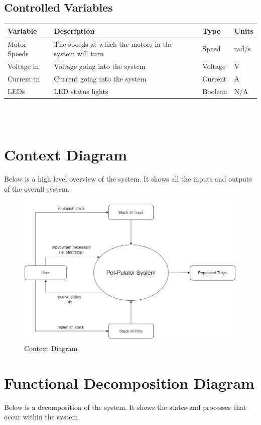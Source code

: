 \documentclass[12pt]{article}
\begin{document}
 \subsection{Controlled Variables}
 \begin{tabular}{ |p{3cm}|p{9cm}|p{2cm}|p{1cm}| }
  \hline
  Variable & Description & Type & Units\\
  \hline
  Motor Speeds & The speeds at which the motors in the system will turn
   & Speed & rad/s\\
  \hline
  Voltage in & Voltage going into the system
   & Voltage & V\\
  \hline
  Current in & Current going into the system
   & Current &  A\\
  \hline
  LEDs & LED status lights
   & Boolean & N/A\\
  
  \hline
 \end{tabular}\\\\

\section{Context Diagram}
Below is a high level overview of the system. It shows all the inputs and outputs
of the overall system.

\begin{figure}[H]
  \includegraphics[width=\linewidth]{contextDiagram.png}
  \caption{Context Diagram}
  \label{fig:context1}
\end{figure}


\section{Functional Decomposition Diagram}
Below is a decomposition of the system. It shows the states and processes that
occur within the system.
\end{document}
